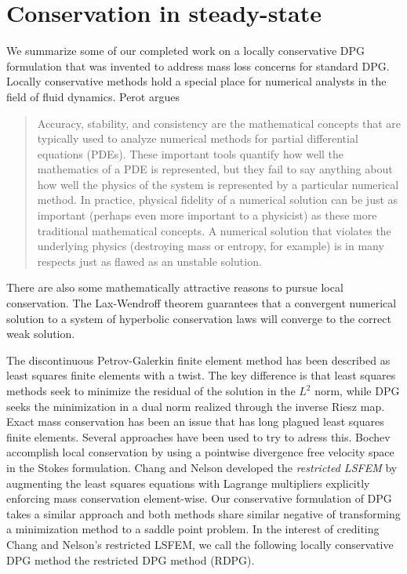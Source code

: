 \documentclass[Proposal.tex]{subfiles}
\begin{document}
\chapter{Conservation in steady-state}
We summarize some of our completed work on a locally conservative DPG formulation that was invented to address mass loss concerns for standard DPG.
Locally conservative methods hold a special place for numerical analysts in
the field of fluid dynamics.
Perot\cite{Perot2011} argues
\begin{quote}
Accuracy, stability, and consistency are the mathematical concepts that are
typically used to analyze numerical methods for partial differential equations
(PDEs). These important tools quantify how well the mathematics of a PDE is
represented, but they fail to say anything about how well the physics of the
system is represented by a particular numerical method. In practice, physical
fidelity of a numerical solution can be just as important (perhaps even more
important to a physicist) as these more traditional mathematical concepts. A
numerical solution that violates the underlying physics (destroying mass or
entropy, for example) is in many respects just as flawed as an unstable
solution.
\end{quote}
There are also some mathematically attractive reasons to pursue local
conservation. The Lax-Wendroff theorem guarantees that a convergent numerical
solution to a system of hyperbolic conservation laws will converge to the
correct weak solution.

The discontinuous Petrov-Galerkin finite element method has been described as
least squares finite elements with a twist. The key difference is that least
squares methods seek to minimize the residual of the solution in the $L^2$
norm, while DPG seeks the minimization in a dual norm realized through the
inverse Riesz map. Exact mass conservation has been an issue that has long plagued
least squares finite elements. Several approaches have been
used to try to adress this. Bochev \etal\cite{Bochev2010} accomplish local
conservation by using a pointwise divergence free velocity space in the Stokes
formulation.  Chang and Nelson\cite{ChangNelson1997} developed the
\emph{restricted LSFEM}\cite{ChangNelson1997} by augmenting the least squares
equations with Lagrange multipliers explicitly enforcing mass conservation
element-wise. Our conservative formulation of DPG takes a similar approach and
both methods share similar negative of transforming a minimization method to a
saddle point problem. In the interest of crediting Chang and Nelson's
restricted LSFEM, we call the following locally conservative DPG method the
restricted DPG method (RDPG).
\end{document}
